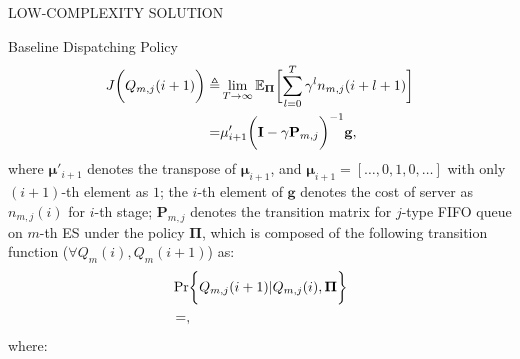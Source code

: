 \documentclass[10pt, conference, letterpaper]{IEEEtran}
\newcommand{\mat}{\mathbf}
\newcommand{\define}{\triangleq}
\renewcommand{\vec}{\mathbf}
\DeclarePairedDelimiter{\Paren}{\bigg(}{\bigg)}
\DeclarePairedDelimiter{\Bracket}{\bigg[}{\bigg]}
\DeclarePairedDelimiter{\Brace}{\bigg\{}{\bigg\}}
\newcommand{\apSet}{\mathcal{K}}
\newcommand{\Stat}{\mathbf{S}}
\newcommand{\Obsv}{\mathcal{Y}}
\newcommand{\Policy}{\boldsymbol{\Omega}}
\begin{document}
\begin{section}{LOW-COMPLEXITY SOLUTION}
\begin{subsection}{Baseline Dispatching Policy}
\begin{align}
                J\Paren{Q_{m,j}(i+1)} \define& \lim_{T\to\infty}
                    \mathbb{E}_{\vec{\Pi}} \Bracket{\sum_{l=0}^{T} \gamma^{l} n_{m,j}(i+l+1)}
                \nonumber\\
                =& \vec{\mu}'_{i+1} \Paren{ \mat{I}-\gamma\mat{P}_{m,j} }^{-1} \vec{g},
            \end{align}
            where $\vec{\mu}'_{i+1}$ denotes the transpose of $\vec{\mu}_{i+1}$, and $\vec{\mu}_{i+1} = [\dots,0,1,0,\dots]$ with only $(i+1)$-th element as $1$; the $i$-th element of $\vec{g}$ denotes the cost of server as $n_{m,j}(i)$ for $i$-th stage; $\mat{P}_{m,j}$ denotes the transition matrix for $j$-type FIFO queue on $m$-th ES under the policy $\vec{\Pi}$, which is composed of the following transition function ($\forall Q_m(i),Q_m(i+1)$) as:
            \begin{align}
                &\Pr \Brace{Q_{m,j}(i+1)|Q_{m,j}(i),\vec{\Pi}}
                \nonumber\\
                &=,
            \end{align}
            where:
        \end{subsection}


\end{section}
\end{document}
